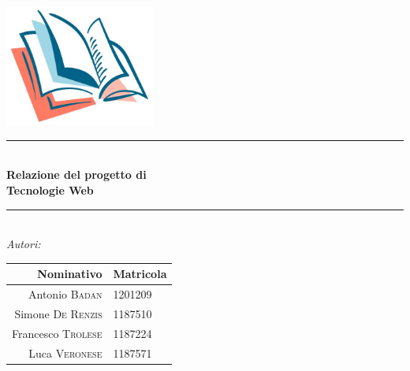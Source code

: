 \documentclass[12pt,a4paper,headings=optiontohead]{scrbook}
\begin{document}

\begin{titlepage}

\newcommand{\HRule}{\rule{\linewidth}{0.5mm}} %

\center %
 




\includegraphics[height=4cm]{../img/btllogo.jpg}\\[0.3cm]

\HRule \\[0.4cm]
{ \huge \bfseries Relazione del progetto di}\\
{ \huge \bfseries Tecnologie Web\\[0.15 cm]} %
\HRule \\[1.5cm]
 
\emph{\Large{Autori:}}\\
\renewcommand{\arraystretch}{1.4}
 \begin{center}
 \begin{tabular}{r|l}	
	\textbf{Nominativo} & \textbf{Matricola}\\ \hline
Antonio \textsc{Badan} & 1201209\\
Simone \textsc{De Renzis} & 1187510\\
Francesco \textsc{Trolese} & 1187224\\
Luca \textsc{Veronese} & 1187571\\
 \end{tabular}
 \end{center}


\end{titlepage}
\end{document}
